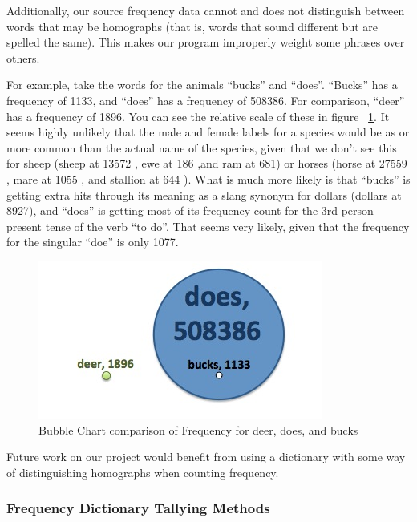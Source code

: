 Additionally, our source frequency data cannot and does not distinguish between words that may be homographs (that is, words that sound different but are spelled the same). This makes our program improperly weight some phrases over others. 

For example, take the words for the animals ``bucks'' and ``does''.  ``Bucks'' has a frequency of 1133, and ``does'' has a frequency of 508386.  For comparison, ``deer'' has a frequency of 1896.  You can see the relative scale of these in figure ~\ref{fig:DoesBucksDeerBubbleGraph}.  It seems highly unlikely that the male and female labels for a species would be as or more common than the actual name of the species, given that we don't see this for sheep (sheep at 13572 , ewe at 186 ,and  ram at 681) or horses (horse at 27559 , mare at 1055 , and stallion at 644 ).  What is much more likely is that ``bucks'' is getting extra hits through its meaning as a slang synonym for dollars (dollars at 8927), and ``does'' is getting most of its frequency count for the 3rd person present tense of the verb ``to do''.  That seems very likely, given that the frequency for the singular ``doe'' is only 1077. 

\begin{figure}
\includegraphics{DoesBucksDeerBubbleGraph.jpg}
\captionfonts
\caption[Bubble Chart comparison of Frequency for deer, does, and bucks]{Bubble Chart comparison of Frequency for deer, does, and bucks }
\label{fig:DoesBucksDeerBubbleGraph}
\end{figure}

Future work on our project would benefit from using a dictionary with some way of distinguishing homographs when counting frequency.


\subsubsection{Frequency Dictionary Tallying Methods}
\label{futureWork:frequency:freqDictTallyMethods}



